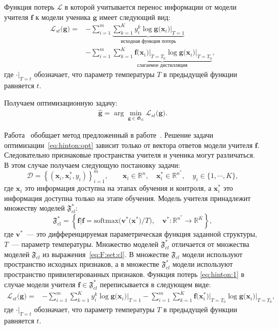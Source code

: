 Функция потерь $\mathcal{L}$ в которой учитывается перенос информации от модели учителя $\mathbf{f}$ к модели ученика $\mathbf{g}$ имеет следующий вид:
\[
\label{eq:hinton:1}
\begin{aligned}
   \mathcal{L}_{st}\bigr(\mathbf{g}\bigr) = &-\sum_{i=1}^{m}\underbrace{{\sum_{k=1}^{K}y^k_i\log\mathbf{g}\bigr(\mathbf{x}_i\bigr)\bigr|_{T=1}}}_{\text{исходная функция потерь}}\\
   &-\sum_{i=1}^{m}\underbrace{{\sum_{k=1}^{K}\mathbf{f}\bigr(\mathbf{x}_i\bigr)\bigr|_{T=T_0}\log\mathbf{g}\bigr(\mathbf{x}_i\bigr)\bigr|_{T=T_0}}}_{\text{слагаемое дистилляция}},
\end{aligned}
\]
где $\cdot\bigr|_{T=t}$ обозначает, что параметр температуры $T$ в предыдущей функции равняется $t$.

Получаем оптимизационную задачу:
\[
\label{eq:hinton:opt}
\begin{aligned}
   \hat{\mathbf{g}} = \arg\min_{\mathbf{g} \in \mathfrak{G}_{\text{cl}}} \mathcal{L}_{st}\bigr(\mathbf{g}\bigr).
\end{aligned}
\]

Работа~\cite{Lopez2016} обобщает метод предложенный в работе~\cite{Hinton2015}. Решение задачи оптимизации~\eqref{eq:hinton:opt} зависит только от вектора ответов модели учителя $\mathbf{f}$. Следовательно признаковые пространства учителя и ученика могут различаться. В этом случае получаем следующую постановку задачи:
\[
    \mathcal{D} = \left\{\left(\mathbf{x}_i, \mathbf{x}^*_i, y_i\right)\right\}_{i=1}^{m}, \qquad \mathbf{x}_i \in \mathbb{R}^{n}, \quad \mathbf{x}^*_i \in \mathbb{R}^{n^*}, \quad y_i \in \{1, \cdots, K\},
\]
где $\mathbf{x}_i$ это информация доступна на этапах обучения и контроля, а $\mathbf{x}^*_i$ это информация доступна только на этапе обучения. Модель учителя принадлежит множеству моделей $\mathfrak{F}_{cl}^*$:
\[
\label{eq:F:set:cl:priv}
\mathfrak{F}_{\text{cl}}^* = \left\{\mathbf{f}| \mathbf{f} = \text{softmax}\bigr(\mathbf{v}^*\bigr(\mathbf{x}^*\bigr)/T\bigr), \quad \mathbf{v}^*: \mathbb{R}^{n^*} \to \mathbb{R}^K \right\},
\]
где $\mathbf{v}^*$~--- это дифференцируемая параметрическая функция заданной структуры, $T$~--- параметр температуры. Множество моделей $\mathfrak{F}_{cl}^*$ отличается от множества моделей $\mathfrak{F}_{cl}$ из выражения~\eqref{eq:F:set:cl}. В множестве $\mathfrak{F}_{cl}$ модели используют пространство исходных признаков, а в множестве $\mathfrak{F}_{cl}^*$ модели используют пространство привилегированных признаков. Функция потерь \eqref{eq:hinton:1} в случае модели учителя $\mathbf{f} \in \mathfrak{F}_{cl}^*$ переписывается в следующем виде:
\[
\label{eq:hinton:L:new}
\begin{aligned}
   \mathcal{L}_{st}\bigr(\mathbf{g}\bigr) = &-\sum_{i=1}^{m}{\sum_{k=1}^{K}y^k_i\log\mathbf{g}\bigr(\mathbf{x}_i\bigr)\bigr|_{T=1}}-\sum_{i=1}^{m}{\sum_{k=1}^{K}\mathbf{f}\bigr(\mathbf{x}^*_i\bigr)\bigr|_{T=T_0}\log\mathbf{g}\bigr(\mathbf{x}_i\bigr)\bigr|_{T=T_0}},
\end{aligned}
\]
где $\cdot\bigr|_{T=t}$ обозначает, что параметр температуры $T$ в предыдущей функции равняется $t$.

